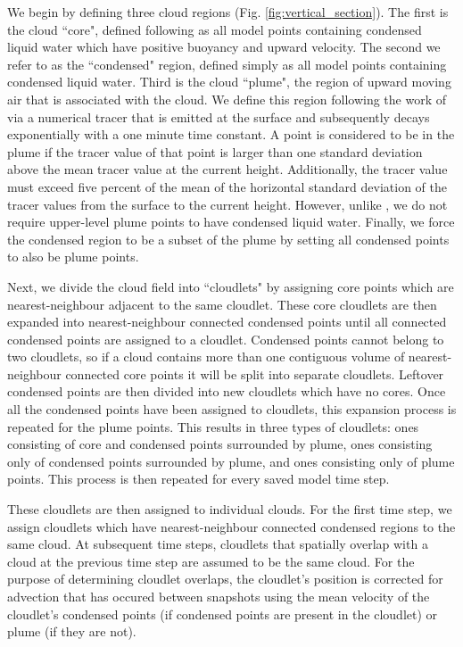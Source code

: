 \documentclass[acp]{copernicus}
\begin{document}
We begin by defining three cloud regions (Fig. \ref{fig:vertical_section}).  
The first is the cloud ``core", defined following \cite{Siebesma1995} as all 
model points containing condensed liquid water which have positive buoyancy and 
upward velocity.  The second we refer to as the ``condensed" region, defined 
simply as all model points containing condensed liquid water.  Third is the 
cloud ``plume", the region of upward moving air that is associated with the 
cloud.  We define this region following the work of \cite{Couvreaux2010} via a 
numerical tracer that is emitted at the surface and subsequently decays 
exponentially with a one minute time constant.  A point is considered to be in 
the plume if the tracer value of that point is larger than one standard 
deviation above the mean tracer value at the current height.  Additionally, 
the tracer value must exceed five percent of the mean of the horizontal 
standard deviation of the tracer values from the surface to the current height.  
However, unlike \citeauthor{Couvreaux2010}, we do not require upper-level 
plume points to have condensed liquid water.  Finally, we force the condensed 
region to be a subset of the plume by setting all condensed points to also be 
plume points.

Next, we divide the cloud field into ``cloudlets" by assigning core points 
which are nearest-neighbour adjacent to the same cloudlet.  These core 
cloudlets are then expanded into nearest-neighbour connected condensed points 
until all connected condensed points are assigned to a cloudlet.  Condensed 
points cannot belong to two cloudlets, so if a cloud contains more than one 
contiguous volume of nearest-neighbour connected core points it will be split 
into separate cloudlets.  Leftover condensed points are then divided into new 
cloudlets which have no cores.  Once all the condensed points have been 
assigned to cloudlets, this expansion process is repeated for the plume points.  
This results in three types of cloudlets: ones consisting of core and condensed 
points surrounded by plume, ones consisting only of condensed points surrounded 
by plume, and ones consisting only of plume points. This process is then 
repeated for every saved model time step.

These cloudlets are then assigned to individual clouds.  For the first time 
step, we assign cloudlets which have nearest-neighbour connected condensed 
regions to the same cloud.  At subsequent time steps, cloudlets that spatially 
overlap with a cloud at the previous time step are assumed to be the same 
cloud.  For the purpose of determining cloudlet overlaps, the cloudlet's 
position is corrected for advection that has occured between snapshots using 
the mean velocity of the cloudlet's condensed points (if condensed points are 
present in the cloudlet) or plume (if they are not).
\end{document}
